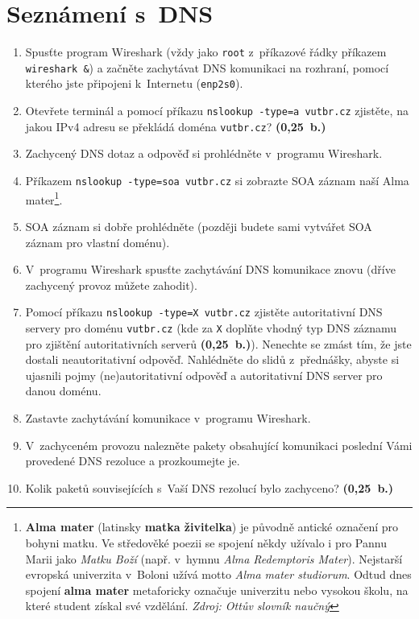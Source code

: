 \section{Seznámení s~DNS}
\begin{enumerate}
    \item Spusťte program Wireshark (vždy jako \texttt{root} z~příkazové řádky příkazem \texttt{wireshark \&}) a začněte zachytávat DNS komunikaci na rozhraní, pomocí kterého jste připojeni k~Internetu (\texttt{enp2s0}).
    \item Otevřete terminál a pomocí příkazu \texttt{nslookup -type=a vutbr.cz} zjistěte, na jakou IPv4 adresu se překládá doména \texttt{vutbr.cz}? \textbf{(0,25~b.)}
    \item Zachycený DNS dotaz a odpověď si prohlédněte v~programu Wireshark.
    \item Příkazem \texttt{nslookup -type=soa vutbr.cz} si zobrazte SOA záznam naší Alma mater\footnote{\textbf{Alma mater} (latinsky \textbf{matka živitelka}) je původně antické označení pro bohyni matku. Ve středověké poezii se spojení někdy užívalo i pro Pannu Marii jako \emph{Matku Boží} (např. v~hymnu \emph{Alma Redemptoris Mater}). Nejstarší evropská univerzita v~Boloni užívá motto \emph{Alma mater studiorum}. Odtud dnes spojení \textbf{alma mater} metaforicky označuje univerzitu nebo vysokou školu, na které student získal své vzdělání. \emph{Zdroj: Ottův slovník naučný}}.
    \item SOA záznam si dobře prohlédněte (později budete sami vytvářet SOA záznam pro vlastní doménu).
    \item V~programu Wireshark spusťte zachytávání DNS komunikace znovu (dříve zachycený provoz můžete zahodit).
    \item Pomocí příkazu \texttt{nslookup -type=X vutbr.cz} zjistěte autoritativní DNS servery pro doménu \texttt{vutbr.cz} (kde za \texttt{X} doplňte vhodný typ DNS záznamu pro zjištění autoritativních serverů \textbf{(0,25~b.)}). Nenechte se zmást tím, že jste dostali neautoritativní odpověď. Nahlédněte do slidů z~přednášky, abyste si ujasnili pojmy (ne)autoritativní odpověď a autoritativní DNS server pro danou doménu.
    \item Zastavte zachytávání komunikace v~programu Wireshark.
    \item V~zachyceném provozu nalezněte pakety obsahující komunikaci poslední Vámi provedené DNS rezoluce a prozkoumejte je.
    \item Kolik paketů souvisejících s~Vaší DNS rezolucí bylo zachyceno? \textbf{(0,25~b.)}

\end{enumerate}
